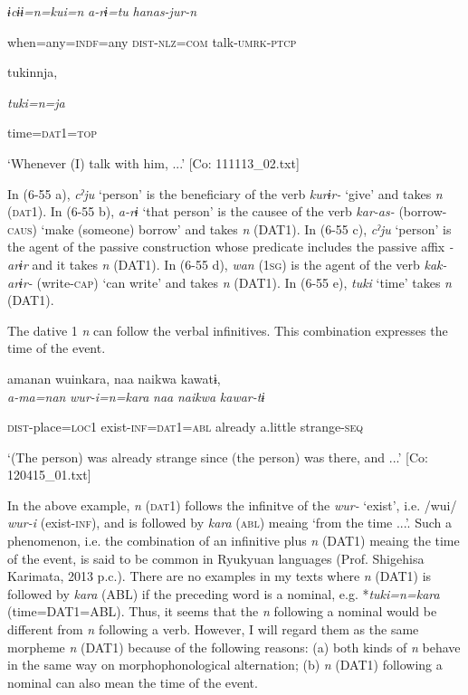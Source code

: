       \textit{ɨcɨɨ=n=kui=n}  \textit{a-rɨ=tu}  \textit{hanas-jur-n}

      when=any=\textsc{indf}=any  \textsc{dist}-\textsc{nlz}=\textsc{com}  talk-\textsc{umrk}-\textsc{ptcp}

      tukinnja,

      \textit{tuki=n=ja}

      time=\textsc{dat}1=\textsc{top}

\glt ‘Whenever (I) talk with him, ...’ [Co: 111113\_02.txt]
\z

In (6-55 a), \textit{cˀju} ‘person’ is the beneficiary of the verb \textit{kurɨr-} ‘give’ and takes \textit{n} (\textsc{dat}1). In (6-55 b), \textit{a-rɨ} ‘that person’ is the causee of the verb \textit{kar-as-} (borrow-\textsc{caus}) ‘make (someone) borrow’ and takes \textit{n} (DAT1). In (6-55 c), \textit{cˀju} ‘person’ is the agent of the passive construction whose predicate includes the passive affix \textit{{}-arɨr} and it takes \textit{n} (DAT1). In (6-55 d), \textit{wan} (1\textsc{sg}) is the agent of the verb \textit{kak-arɨr-} (write-\textsc{cap}) ‘can write’ and takes \textit{n} (DAT1). In (6-55 e), \textit{tuki} ‘time’ takes \textit{n} (DAT1).

  The dative 1 \textit{n} can follow the verbal infinitives. This combination expresses the time of the event.

\ea\label{ex:6-56}
{\TM}
\gll amanan  wuinkara,  naa  naikwa  kawatɨ,\\

    \textit{a-ma=nan}  \textit{wur-i=n=kara}  \textit{naa}  \textit{naikwa}  \textit{kawar-tɨ}

    \textsc{dist}-place=\textsc{loc}1  exist-\textsc{inf}=\textsc{dat}1=\textsc{abl}  already  a.little  strange-\textsc{seq}

\glt    ‘(The person) was already strange since (the person) was there, and ...’ [Co: 120415\_01.txt]
\z

In the above example, \textit{n} (\textsc{dat}1) follows the infinitve of the \textit{wur-} ‘exist’, i.e. /wui/ \textit{wur-i} (exist-\textsc{inf}), and is followed by \textit{kara} (\textsc{abl}) meaing ‘from the time ...’. Such a phenomenon, i.e. the combination of an infinitive plus \textit{n} (DAT1) meaing the time of the event, is said to be common in Ryukyuan languages (Prof. Shigehisa Karimata, 2013 p.c.). There are no examples in my texts where \textit{n} (DAT1) is followed by \textit{kara} (ABL) if the preceding word is a nominal, e.g. *\textit{tuki=n=kara} (time=DAT1=ABL). Thus, it seems that the \textit{n} following a nominal would be different from \textit{n} following a verb. However, I will regard them as the same morpheme \textit{n} (DAT1) because of the following reasons: (a) both kinds of \textit{n} behave in the same way on morphophonological alternation; (b) \textit{n} (DAT1) following a nominal can also mean the time of the event.

